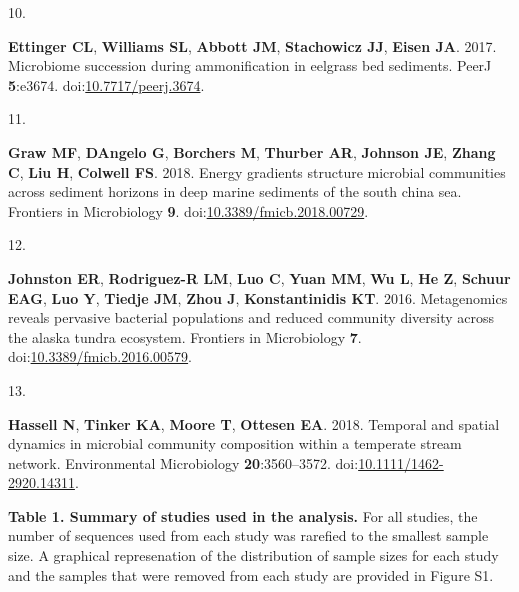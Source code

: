 \documentclass[
]{article}
\newlength{\cslhangindent}
\newlength{\csllabelwidth}
\newlength{\cslentryspacingunit} %
\newenvironment{CSLReferences}[2] %
 {%
  \setlength{\parindent}{0pt}
  \ifodd #1
  \let\oldpar\par
  \def\par{\hangindent=\cslhangindent\oldpar}
  \fi
  \setlength{\parskip}{#2\cslentryspacingunit}
 }%
 {}
\newcommand{\CSLLeftMargin}[1]{\parbox[t]{\csllabelwidth}{#1}}
\newcommand{\CSLRightInline}[1]{\parbox[t]{\linewidth - \csllabelwidth}{#1}\break}
\begin{document}
\begin{CSLReferences}{0}{1}
\leavevmode{}%
\CSLLeftMargin{10. }%
\CSLRightInline{\textbf{Ettinger CL}, \textbf{Williams SL},
\textbf{Abbott JM}, \textbf{Stachowicz JJ}, \textbf{Eisen JA}. 2017.
Microbiome succession during ammonification in eelgrass bed sediments.
{PeerJ} \textbf{5}:e3674.
doi:\href{https://doi.org/10.7717/peerj.3674}{10.7717/peerj.3674}.}

\leavevmode{}%
\CSLLeftMargin{11. }%
\CSLRightInline{\textbf{Graw MF}, \textbf{DAngelo G}, \textbf{Borchers
M}, \textbf{Thurber AR}, \textbf{Johnson JE}, \textbf{Zhang C},
\textbf{Liu H}, \textbf{Colwell FS}. 2018. Energy gradients structure
microbial communities across sediment horizons in deep marine sediments
of the south china sea. Frontiers in Microbiology \textbf{9}.
doi:\href{https://doi.org/10.3389/fmicb.2018.00729}{10.3389/fmicb.2018.00729}.}

\leavevmode{}%
\CSLLeftMargin{12. }%
\CSLRightInline{\textbf{Johnston ER}, \textbf{Rodriguez-R LM},
\textbf{Luo C}, \textbf{Yuan MM}, \textbf{Wu L}, \textbf{He Z},
\textbf{Schuur EAG}, \textbf{Luo Y}, \textbf{Tiedje JM}, \textbf{Zhou
J}, \textbf{Konstantinidis KT}. 2016. Metagenomics reveals pervasive
bacterial populations and reduced community diversity across the alaska
tundra ecosystem. Frontiers in Microbiology \textbf{7}.
doi:\href{https://doi.org/10.3389/fmicb.2016.00579}{10.3389/fmicb.2016.00579}.}

\leavevmode{}%
\CSLLeftMargin{13. }%
\CSLRightInline{\textbf{Hassell N}, \textbf{Tinker KA}, \textbf{Moore
T}, \textbf{Ottesen EA}. 2018. Temporal and spatial dynamics in
microbial community composition within a temperate stream network.
Environmental Microbiology \textbf{20}:3560--3572.
doi:\href{https://doi.org/10.1111/1462-2920.14311}{10.1111/1462-2920.14311}.}

\end{CSLReferences}


\setlength{\parindent}{0in}
\setlength{\leftskip}{0in}

\newpage

\textbf{Table 1. Summary of studies used in the analysis.} For all
studies, the number of sequences used from each study was rarefied to
the smallest sample size. A graphical represenation of the distribution
of sample sizes for each study and the samples that were removed from
each study are provided in Figure S1.
\end{document}
